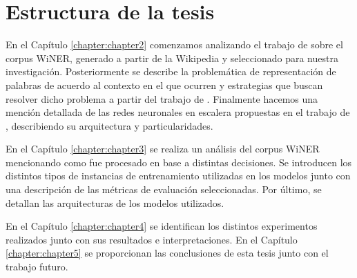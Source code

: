 \section{Estructura de la tesis}

En el Capítulo \ref{chapter:chapter2} comenzamos analizando el trabajo de \cite{WiNER-Ghaddar-Langlais} sobre el corpus WiNER, generado a partir de la Wikipedia y seleccionado para nuestra investigación. Posteriormente se describe la problemática de representación de palabras de acuerdo al contexto en el que ocurren y estrategias que buscan resolver dicho problema a partir del trabajo de \cite{iacobacci-etal-2016-embeddings}. Finalmente hacemos una mención detallada de las redes neuronales en escalera propuestas en el trabajo de \cite{DBLP:journals/corr/RasmusVHBR15}, describiendo su arquitectura y particularidades. 

En el Capítulo \ref{chapter:chapter3} se realiza un análisis del corpus WiNER mencionando como fue procesado en base a distintas decisiones. Se introducen los distintos tipos de instancias de entrenamiento utilizadas en los modelos junto con una descripción de las métricas de evaluación seleccionadas. Por último, se detallan las arquitecturas de los modelos utilizados.

En el Capítulo \ref{chapter:chapter4} se identifican los distintos experimentos realizados junto con sus resultados e interpretaciones. 
En el Capítulo \ref{chapter:chapter5} se proporcionan las conclusiones de esta tesis junto con el trabajo futuro.